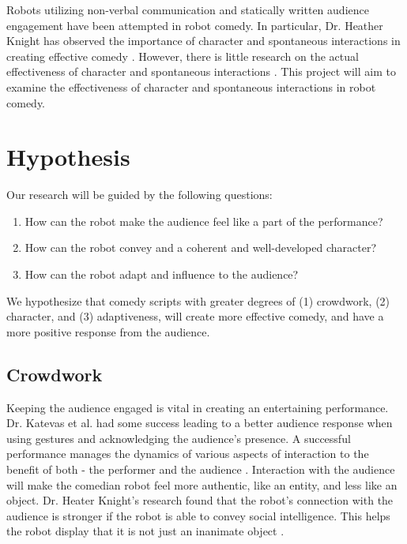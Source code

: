 \documentclass[onecolumn, draftclsnofoot,10pt, compsoc]{IEEEtran}
\begin{document}

Robots utilizing non-verbal communication and statically written audience engagement have been attempted in robot comedy. In particular, Dr. Heather Knight has observed the importance of character and spontaneous interactions in creating effective comedy \cite{KnightEightLessons:2011}. However, there is little research on the actual effectiveness of character and spontaneous interactions \cite{KatevasRobot:2014}. This project will aim to examine the effectiveness of character and spontaneous interactions in robot comedy.

\section{Hypothesis}

Our research will be guided by the following questions:
\begin{enumerate}[\IEEEsetlabelwidth{6)}]
\item How can the robot make the audience feel like a part of the performance?
\item How can the robot convey and a coherent and well-developed character?
\item How can the robot adapt and influence to the audience?
\end{enumerate}

We hypothesize that comedy scripts with greater degrees of (1) crowdwork, (2) character, and (3) adaptiveness, will create more effective comedy, and have a more positive response from the audience.

\subsection{Crowdwork}

Keeping the audience engaged is vital in creating an entertaining performance. Dr. Katevas et al. had some success leading to a better audience response when using gestures and acknowledging the audience's presence. A successful performance manages the dynamics of various aspects of interaction to the benefit of both - the performer and the audience \cite{RobotComedyLab:2015}. Interaction with the audience will make the comedian robot feel more authentic, like an entity, and less like an object. Dr. Heater Knight's research found that the robot's connection with the audience is stronger if the robot is able to convey social intelligence. This helps the robot display that it is not just an inanimate object \cite {KnightEightLessons:2011}.
\end{document}

